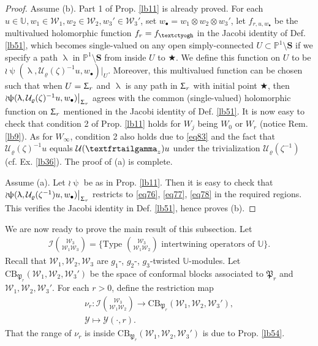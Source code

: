 \documentclass[12pt,a4paper,notitlepage]{article}
\theoremstyle{definition}
\theoremstyle{plain}
\newcommand{\fk}{\mathfrak}
\newcommand{\mc}{\mathcal}
\newcommand{\blt}{\bullet}
\newcommand{\Ubb}{\mathbb U}
\newcommand{\Pbb}{\mathbb P}
\newcommand{\Sbf}{\mathbf{S}}
\newcommand{\CB}{\mathrm{CB}}
\newcommand{\tipaz}{\text{\textctyogh}}
\newcommand{\tipxgamma}{\text{\textfrtailgamma}}
\numberwithin{equation}{subsection}
\begin{document}
\begin{proof}
Assume (b). Part 1 of Prop. \ref{lb11} is already proved. For each $u\in\Ubb,w_1\in\mc W_1,w_2\in\mc W_2,w_3'\in\mc W_3'$, set $w_\blt=w_1\otimes w_2\otimes w_3'$, let $f_{r,u,w_\blt}$ be the multivalued holomorphic function $f_r=f_\tipaz$ in the Jacobi identity of Def. \ref{lb51}, which becomes single-valued on any open simply-connected  $U\subset\Pbb^1\setminus\Sbf$ if we specify a path $\uplambda$ in $\Pbb^1\setminus\Sbf$ from inside $U$ to $\bigstar$.  We define this function on $U$ to be $\wr\uppsi(\uplambda,\mc U_\varrho(\zeta)^{-1}u,w_\blt)\big|_U$. Moreover, this multivalued function can be chosen such that when $U=\Upsigma_r$ and $\uplambda$ is any path in $\Upsigma_r$ with initial point $\bigstar$, then $\wr\uppsi(\uplambda,\mc U_\varrho(\zeta)^{-1}u,w_\blt)\big|_{\Upsigma_r}$ agrees with the common (single-valued) holomorphic function on $\Upsigma_r$ mentioned in the Jacobi identity of Def. \ref{lb51}. It is now easy to check that condition 2 of Prop. \ref{lb11} holds for $W_j$ being $W_0$ or $W_r$ (notice Rem. \ref{lb9}). As for $W_\infty$, condition 2 also holds due to \eqref{eq83} and the fact that $\mc U_\varrho(\zeta)^{-1}u$ equals $\mc U(\tipxgamma_z)u$ under the trivialization $\mc U_\varrho(\zeta^{-1})$  (cf. Ex. \ref{lb36}). The proof of (a) is complete.

Assume (a). Let $\wr\uppsi$ be as in Prop. \ref{lb11}. Then it is easy to check that $\wr\uppsi(\uplambda,\mc U_\varrho(\zeta^{-1})u,w_\blt)\big|_{\Upsigma_r}$ restricts to \eqref{eq76}, \eqref{eq77}, \eqref{eq78} in the required regions. This verifies the Jacobi identity in Def. \ref{lb51}, hence proves (b).
\end{proof}






We are now ready to prove the main result of this subsection. Let
\begin{align*}
\mc I{\mc W_3\choose \mc W_1\mc W_3}=\bigg\{\text{Type }{\mc W_3\choose \mc W_1\mc W_2}\text{ intertwining operators of }\Ubb\bigg\}.	
\end{align*}
Recall that $\mc W_1,\mc W_2,\mc W_3$ are  $g_1$-, $g_2$-, $g_3$-twisted $\Ubb$-modules. Let $\CB_{\fk P_r}(\mc W_1,\mc W_2,\mc W_3')$ be the space of conformal blocks associated to $\fk P_r$ and $\mc W_1,\mc W_2,\mc W_3'$. For each $r>0$, define the restriction map
\begin{gather*}
\nu_r:	\mc I{\mc W_3\choose \mc W_1\mc W_2}\rightarrow \CB_{\fk P_r}(\mc W_1,\mc W_2,\mc W_3'),\\
\mc Y\mapsto \mc Y(\cdot,r).
\end{gather*}
That the range of $\nu_r$ is inside $ \CB_{\fk P_r}(\mc W_1,\mc W_2,\mc W_3')$ is due to Prop. \ref{lb54}.
\end{document}
